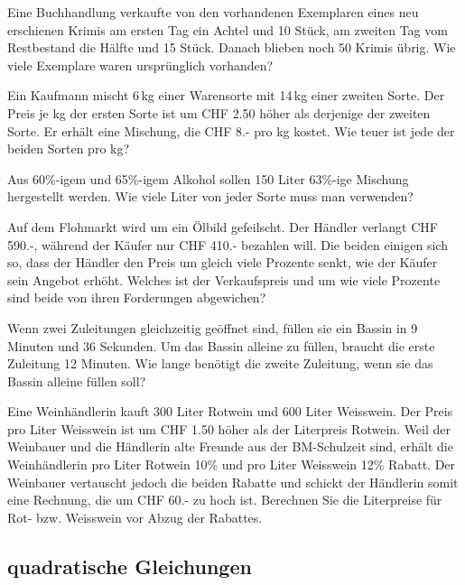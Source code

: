 Eine Buchhandlung verkaufte von den vorhandenen Exemplaren eines
  neu erschienen Krimis am ersten Tag ein Achtel und 10 Stück, am
  zweiten Tag vom Restbestand die Hälfte und 15 Stück. Danach blieben
  noch 50 Krimis übrig. Wie viele Exemplare waren ursprünglich
  vorhanden?

 Ein Kaufmann mischt 6\,kg einer Warensorte mit 14\,kg einer
  zweiten Sorte. Der Preis je kg der ersten Sorte ist um CHF 2.50
  höher als derjenige der zweiten Sorte. Er erhält eine Mischung, die
  CHF 8.- pro kg kostet. Wie teuer ist jede der beiden Sorten pro kg?


Aus 60\%-igem und 65\%-igem Alkohol sollen 150 Liter 63\%-ige
  Mischung hergestellt werden. Wie viele Liter von jeder Sorte muss
  man verwenden?



Auf dem Flohmarkt wird um ein Ölbild gefeilscht. Der Händler
  verlangt CHF 590.-, während der Käufer nur CHF 410.- bezahlen
  will. Die beiden einigen sich so, dass der Händler den Preis um
  gleich viele Prozente senkt, wie der Käufer sein Angebot
  erhöht. Welches ist der Verkaufspreis und um wie viele Prozente sind
  beide von ihren Forderungen abgewichen?


Wenn zwei Zuleitungen gleichzeitig geöffnet sind, füllen sie ein
  Bassin in 9 Minuten und 36 Sekunden. Um das Bassin alleine zu
  füllen, braucht die erste Zuleitung 12 Minuten. Wie lange benötigt
  die zweite Zuleitung, wenn sie das Bassin alleine füllen soll?




Eine Weinhändlerin kauft 300 Liter Rotwein und 600 Liter
  Weisswein. Der Preis pro Liter Weisswein ist um CHF 1.50 höher als der
  Literpreis Rotwein. Weil der Weinbauer und die Händlerin alte
  Freunde aus der BM-Schulzeit sind, erhält die Weinhändlerin pro
  Liter Rotwein 10\% und pro Liter Weisswein 12\% Rabatt.
  Der Weinbauer vertauscht jedoch die beiden Rabatte und schickt der
  Händlerin somit eine Rechnung, die um CHF 60.- zu hoch ist.
  Berechnen Sie die Literpreise für Rot- bzw. Weisswein vor Abzug der
  Rabattes.









\subsection{quadratische Gleichungen}

